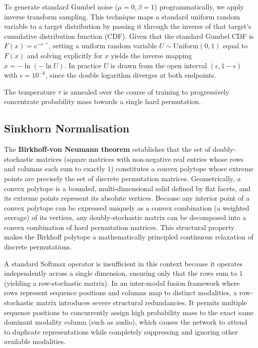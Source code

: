 \documentclass[10pt,a4paper,twocolumn]{article}
\begin{document}
	To generate standard Gumbel noise ($\mu=0, \beta=1$) programmatically, we apply inverse transform sampling. This technique maps a standard uniform random variable to a target distribution by passing it through the inverse of that target's cumulative distribution function (CDF). Given that the standard Gumbel CDF is $F(x) = e^{-e^{-x}}$, setting a uniform random variable $U \sim \mathrm{Uniform}(0,1)$ equal to $F(x)$ and solving explicitly for $x$ yields the inverse mapping $x = -\ln(-\ln U)$. In practice $U$ is drawn from the open interval $(\epsilon, 1-\epsilon)$ with $\epsilon = 10^{-6}$, since the double logarithm diverges at both endpoints.
	
	The temperature $\tau$ is annealed over the course of training to progressively concentrate probability mass towards a single hard permutation.
	
	\subsection*{Sinkhorn Normalisation}
	The \textbf{Birkhoff-von Neumann theorem} \cite{birkhoff1946} establishes that the set of doubly-stochastic matrices (square matrices with non-negative real entries whose rows and columns each sum to exactly $1$) constitutes a convex polytope whose extreme points are precisely the set of discrete permutation matrices. Geometrically, a convex polytope is a bounded, multi-dimensional solid defined by flat facets, and its extreme points represent its absolute vertices. Because any interior point of a convex polytope can be expressed uniquely as a convex combination (a weighted average) of its vertices, any doubly-stochastic matrix can be decomposed into a convex combination of hard permutation matrices. This structural property makes the Birkhoff polytope a mathematically principled continuous relaxation of discrete permutations.
	
	A standard Softmax operator is insufficient in this context because it operates independently across a single dimension, ensuring only that the rows sum to $1$ (yielding a row-stochastic matrix). In an inter-modal fusion framework where rows represent sequence positions and columns map to distinct modalities, a row-stochastic matrix introduces severe structural redundancies. It permits multiple sequence positions to concurrently assign high probability mass to the exact same dominant modality column (such as audio), which causes the network to attend to duplicate representations while completely suppressing and ignoring other available modalities.
	
\end{document}

